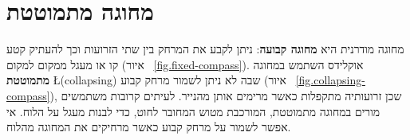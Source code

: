 
\chapter{מחוגה מתמוטטת}\label{c.collapse}


\vspace*{-2ex}

מחוגה מודרנית היא 
\textbf{מחוגה קבועה}:
ניתן לקבע את המרחק בין שתי הזרועות וכך להעתיק קטע קו או מעגל ממקום למקום (איור%
~\ref{fig.fixed-compass}).
אוקלידס השתמש במחוגה 
\textbf{מתמוטטת}
\L{(collapsing)}
שבה לא ניתן לשמור מרחק קבוע (איור%
~\ref{fig.collapsing-compass}),
שכן זרועותיה מתקפלות כאשר מרימים אותן מהנייר. לעיתים קרובות משתמשים מורים במחוגה מתמוטטת, המורכבת מטוש המחובר לחוט, כדי לבנות מעגל על הלוח. אי אפשר לשמור על מרחק קבוע כאשר מרחיקים את המחוגה מהלוח.

